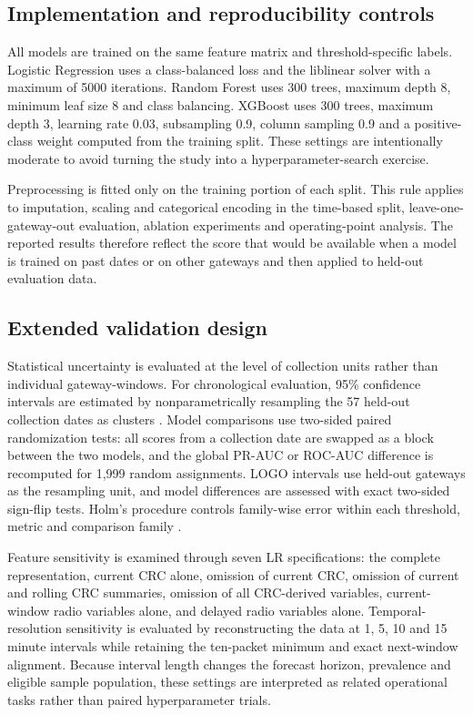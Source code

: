 \documentclass{jot}
\begin{document}
\subsection{Implementation and reproducibility controls}\label{s:3.5}
All models are trained on the same feature matrix and threshold-specific labels. Logistic Regression uses a class-balanced loss and the liblinear solver with a maximum of 5000 iterations. Random Forest uses 300 trees, maximum depth 8, minimum leaf size 8 and class balancing. XGBoost uses 300 trees, maximum depth 3, learning rate 0.03, subsampling 0.9, column sampling 0.9 and a positive-class weight computed from the training split. These settings are intentionally moderate to avoid turning the study into a hyperparameter-search exercise.

Preprocessing is fitted only on the training portion of each split. This rule applies to imputation, scaling and categorical encoding in the time-based split, leave-one-gateway-out evaluation, ablation experiments and operating-point analysis. The reported results therefore reflect the score that would be available when a model is trained on past dates or on other gateways and then applied to held-out evaluation data.

\subsection{Extended validation design}\label{s:3.6}
Statistical uncertainty is evaluated at the level of collection units rather than individual gateway-windows. For chronological evaluation, 95\% confidence intervals are estimated by nonparametrically resampling the 57 held-out collection dates as clusters \cite{25}. Model comparisons use two-sided paired randomization tests: all scores from a collection date are swapped as a block between the two models, and the global PR-AUC or ROC-AUC difference is recomputed for 1,999 random assignments. LOGO intervals use held-out gateways as the resampling unit, and model differences are assessed with exact two-sided sign-flip tests. Holm's procedure controls family-wise error within each threshold, metric and comparison family \cite{20}.

Feature sensitivity is examined through seven LR specifications: the complete representation, current CRC alone, omission of current CRC, omission of current and rolling CRC summaries, omission of all CRC-derived variables, current-window radio variables alone, and delayed radio variables alone. Temporal-resolution sensitivity is evaluated by reconstructing the data at 1, 5, 10 and 15 minute intervals while retaining the ten-packet minimum and exact next-window alignment. Because interval length changes the forecast horizon, prevalence and eligible sample population, these settings are interpreted as related operational tasks rather than paired hyperparameter trials.
\end{document}
